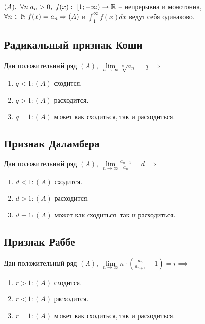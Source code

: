 \begin{theorem}
    $ (A), \ \forall n \ a_n > 0, \ f(x): \ [1;+\infty) \rightarrow \R $ -- непрерывна и монотонна, $ \forall n \in \mathbb{N} \ f(x) = a_n \Rightarrow (A)$ и $\int_{1}^{\infty}f(x)dx$ ведут себя одинаково.
\end{theorem}

\subsection{Радикальный признак Коши}

\begin{theorem}
    Дан положительный ряд $(A), \ \underset{n\rightarrow\infty}{\overline{\lim}}\sqrt[n]{a_n} = q\implies $
    \begin{enumerate}
        \item $q < 1: (A)$ сходится.
        \item $q > 1: (A)$ расходится.
        \item $q = 1: (A)$ может как сходиться, так и расходиться.
    \end{enumerate}
\end{theorem}

\newpage

\subsection{Признак Даламбера}

\begin{theorem}
    Дан положительный ряд $(A), \ \underset{n\rightarrow\infty}{\lim}\frac{a_{n+1}}{a_n} = d \implies $
    \begin{enumerate}
        \item $d < 1:(A)$ сходится.
        \item $d > 1:(A)$ расходится.
        \item $d = 1:(A)$ может как сходиться, так и расходиться.
    \end{enumerate}
\end{theorem}

\subsection{Признак Раббе}

\begin{theorem}
    Дан положительный ряд $(A), \ \underset{n\rightarrow\infty}{\lim}n \cdot \left(\frac{a_n}{a_{n+1}} - 1\right) = r \implies $
    \begin{enumerate}
        \item $r>1: (A)$ сходится.
        \item $r<1: (A)$ расходится.
        \item $r=1: (A)$ может как сходиться, так и расходиться.
    \end{enumerate}
\end{theorem}

